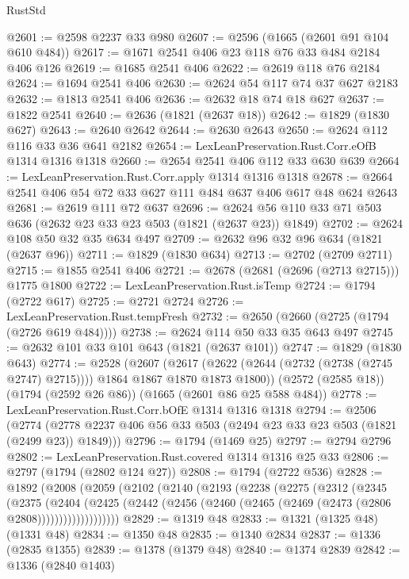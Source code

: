 \begin{lexlean}{RustStd}
\begin{coremodule}
@2601 := @2598 @2237 @33 @980
@2607 := @2596 (@1665 (@2601 @91 @104 @610 @484))
@2617 := @1671 @2541 @406 @23 @118 @76 @33 @484 @2184 @406 @126
@2619 := @1685 @2541 @406
@2622 := @2619 @118 @76 @2184
@2624 := @1694 @2541 @406
@2630 := @2624 @54 @117 @74 @37 @627 @2183
@2632 := @1813 @2541 @406
@2636 := @2632 @18 @74 @18 @627
@2637 := @1822 @2541
@2640 := @2636 (@1821 (@2637 @18))
@2642 := @1829 (@1830 @627)
@2643 := @2640 @2642
@2644 := @2630 @2643
@2650 := @2624 @112 @116 @33 @36 @641 @2182
@2654 := LexLeanPreservation.Rust.Corr.eOfB @1314 @1316 @1318
@2660 := @2654 @2541 @406 @112 @33 @630 @639
@2664 := LexLeanPreservation.Rust.Corr.apply @1314 @1316 @1318
@2678 := @2664 @2541 @406 @54 @72 @33 @627 @111 @484 @637 @406 @617 @48 @624 @2643
@2681 := @2619 @111 @72 @637
@2696 := @2624 @56 @110 @33 @71 @503 @636 (@2632 @23 @33 @23 @503 (@1821 (@2637 @23)) @1849)
@2702 := @2624 @108 @50 @32 @35 @634 @497
@2709 := @2632 @96 @32 @96 @634 (@1821 (@2637 @96))
@2711 := @1829 (@1830 @634)
@2713 := @2702 (@2709 @2711)
@2715 := @1855 @2541 @406
@2721 := @2678 (@2681 (@2696 (@2713 @2715))) @1775 @1800
@2722 := LexLeanPreservation.Rust.isTemp
@2724 := @1794 (@2722 @617)
@2725 := @2721 @2724
@2726 := LexLeanPreservation.Rust.tempFresh
@2732 := @2650 (@2660 (@2725 (@1794 (@2726 @619 @484))))
@2738 := @2624 @114 @50 @33 @35 @643 @497
@2745 := @2632 @101 @33 @101 @643 (@1821 (@2637 @101))
@2747 := @1829 (@1830 @643)
@2774 := @2528
    (@2607
      (@2617 (@2622 (@2644 (@2732 (@2738 (@2745 @2747) @2715)))) @1864 @1867 @1870 @1873 @1800))
    (@2572 (@2585 @18))
    (@1794 (@2592 @26 @86))
    (@1665 (@2601 @86 @25 @588 @484))
@2778 := LexLeanPreservation.Rust.Corr.bOfE @1314 @1316 @1318
@2794 := @2506
    (@2774 (@2778 @2237 @406 @56 @33 @503 (@2494 @23 @33 @23 @503 (@1821 (@2499 @23)) @1849)))
@2796 := @1794 (@1469 @25)
@2797 := @2794 @2796
@2802 := LexLeanPreservation.Rust.covered @1314 @1316 @25 @33
@2806 := @2797 (@1794 (@2802 @124 @27))
@2808 := @1794 (@2722 @536)
@2828 := @1892
    (@2008
      (@2059
        (@2102
          (@2140
            (@2193
              (@2238
                (@2275
                  (@2312
                    (@2345
                      (@2375
                        (@2404
                          (@2425
                            (@2442
                              (@2456 (@2460 (@2465 (@2469 (@2473 (@2806 @2808)))))))))))))))))))
@2829 := @1319 @48
@2833 := @1321 (@1325 @48) (@1331 @48)
@2834 := @1350 @48
@2835 := @1340 @2834
@2837 := @1336 (@2835 @1355)
@2839 := @1378 (@1379 @48)
@2840 := @1374 @2839
@2842 := @1336 (@2840 @1403)

\end{coremodule}
\end{lexlean}
